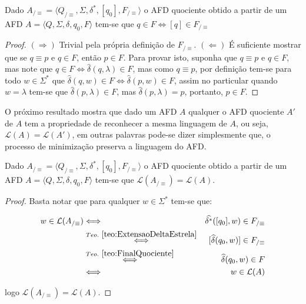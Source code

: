 \begin{theorem}\label{teo:FinalQuociente}
	Dado  $A_{/\equiv} = \langle Q_{/\equiv}, \Sigma, \delta^*, [q_0],  F_{/\equiv}\rangle$ o AFD quociente obtido a partir de um AFD $A = \langle Q, \Sigma, \delta, q_0, F\rangle$ tem-se que $q \in F \Longleftrightarrow [q] \in F_{/\equiv}$
\end{theorem}

\begin{proof}
	$(\Rightarrow)$ Trivial pela própria definição de $ F_{/\equiv}$. $(\Leftarrow)$ É suficiente mostrar que se $q \equiv p$ e $q \in F$, então $p \in F$. Para provar isto, suponha que $q \equiv p$ e $q \in F$, mas note que $q \in F \Longleftrightarrow \widehat{\delta}(q, \lambda) \in F$, mas como $q \equiv p$, por definição tem-se para todo $w \in \Sigma^*$ que $\widehat{\delta}(q, w) \in F \Longleftrightarrow \widehat{\delta}(p, w) \in F$, assim no particular quando $w = \lambda$ tem-se que  $\widehat{\delta}(p, \lambda) \in F$, mas $\widehat{\delta}(p, \lambda) = p$, portanto, $p \in F$.
\end{proof}

O próximo resultado mostra que dado um AFD $A$ qualquer o  AFD quociente $A'$ de $A$ tem a propriedade de reconhecer a mesma linguagem de $A$, ou seja, $\mathcal{L}(A) = \mathcal{L}(A')$, em outras palavras pode-se dizer simplesmente que, o processo de minimização preserva a linguagem do AFD. 

\begin{theorem}\label{teo:LinguagemQuociente}
	Dado  $A_{/\equiv} = \langle Q_{/\equiv}, \Sigma, \delta^*, [q_0],  F_{/\equiv}\rangle$ o AFD quociente obtido a partir de um AFD $A = \langle Q, \Sigma, \delta, q_0, F\rangle$ tem-se que $\mathcal{L}(A_{/\equiv}) = \mathcal{L}(A)$.
\end{theorem}

\begin{proof}
	Basta notar que para qualquer $w \in \Sigma^*$ tem-se que:
	
	\begin{eqnarray*}
		w \in \mathcal{L}(A_{/\equiv}) & \Longleftrightarrow & \widehat{\delta^*}([q_0], w) \in F_{/\equiv}\\
		&  \stackrel{Teo. \ \ref{teo:ExtensaoDeltaEstrela}}{\Longleftrightarrow} & [\widehat{\delta}(q_0, w)] \in F_{/\equiv}\\
		& \stackrel{Teo. \ \ref{teo:FinalQuociente}}{\Longleftrightarrow} & \widehat{\delta}(q_0, w) \in F\\
		& \Longleftrightarrow & w \in \mathcal{L}(A)
	\end{eqnarray*}
	
	\noindent logo $\mathcal{L}(A_{/\equiv}) = \mathcal{L}(A)$.
\end{proof}

